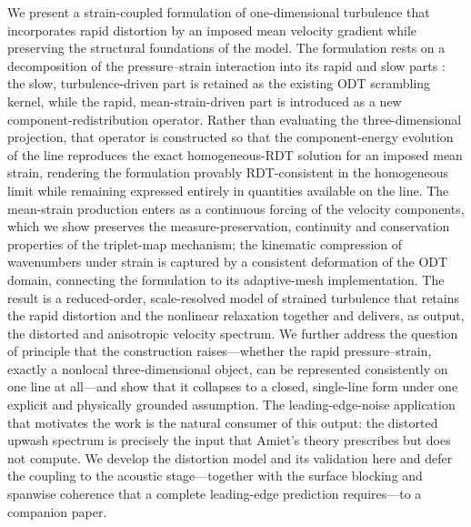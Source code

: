 \documentclass[lineno]{JFM-FLM_Au}
\newcounter{assumption}
\begin{document}
We present a strain-coupled formulation of one-dimensional turbulence that
incorporates rapid distortion by an imposed mean velocity gradient while
preserving the structural foundations of the model. The formulation rests on a
decomposition of the pressure--strain interaction into its rapid and slow parts
\citep{Pope2000}: the slow, turbulence-driven part is retained as the existing
ODT scrambling kernel, while the rapid, mean-strain-driven part is introduced as
a new component-redistribution operator. Rather than evaluating the
three-dimensional projection, that operator is constructed so that the
component-energy evolution of the line reproduces the exact homogeneous-RDT
solution for an imposed mean strain, rendering the formulation provably
RDT-consistent in the homogeneous limit while remaining expressed entirely in
quantities available on the line. The mean-strain production enters as a
continuous forcing of the velocity components, which we show preserves the
measure-preservation, continuity and conservation properties of the triplet-map
mechanism; the kinematic compression of wavenumbers under strain is captured by
a consistent deformation of the ODT domain, connecting the formulation to its
adaptive-mesh implementation. The result is a reduced-order, scale-resolved
model of strained turbulence that retains the rapid distortion and the nonlinear
relaxation together and delivers, as output, the distorted and anisotropic
velocity spectrum. We further address the question of principle that the
construction raises---whether the rapid pressure--strain, exactly a nonlocal
three-dimensional object, can be represented consistently on one line at
all---and show that it collapses to a closed, single-line form under one
explicit and physically grounded assumption. The leading-edge-noise application
that motivates the work is the natural consumer of this output: the distorted
upwash spectrum is precisely the input that Amiet's theory prescribes but does
not compute. We develop the distortion model and its validation here and defer
the coupling to the acoustic stage---together with the surface blocking and
spanwise coherence that a complete leading-edge prediction requires---to a
companion paper.
\end{document}
